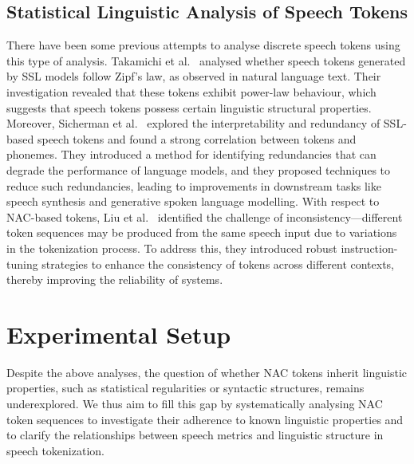 \documentclass[conference]{IEEEtran}
\begin{document}
\subsection{Statistical Linguistic Analysis of Speech Tokens}

There have been some previous attempts to analyse discrete speech tokens using this type of analysis. 
Takamichi et al.~\cite{takamichi2024learned} analysed whether speech tokens generated by SSL models follow Zipf's law, as observed in natural language text. Their investigation revealed that these tokens exhibit power-law behaviour, which suggests that speech tokens possess certain linguistic structural properties. 
Moreover, Sicherman et al.~\cite{Sicherman2023AnalysingDS} explored the interpretability and redundancy of SSL-based speech tokens and found a strong correlation between tokens and phonemes. They introduced a method for identifying redundancies that can degrade the performance of language models, and they proposed techniques to reduce such redundancies, leading to improvements in downstream tasks like speech synthesis and generative spoken language modelling. 
With respect to NAC-based tokens, Liu et al.~\cite{liu2024visual} identified the challenge of inconsistency—different token sequences may be produced from the same speech input due to variations in the tokenization process. To address this, they introduced robust instruction-tuning strategies to enhance the consistency of tokens across different contexts, thereby improving the reliability of systems. 

\vspace{-2mm}
\section{Experimental Setup}  

Despite the above analyses, the question of whether NAC tokens inherit linguistic properties, such as statistical regularities or syntactic structures, remains underexplored. We thus aim to fill this gap by systematically analysing NAC token sequences to investigate their adherence to known linguistic properties and to clarify the relationships between speech metrics and linguistic structure in speech tokenization.

\end{document}
